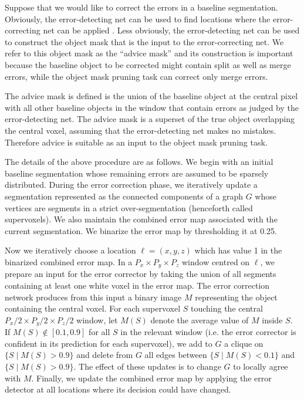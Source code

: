 \documentclass{article}
\begin{document}
Suppose that we would like to correct the errors in a baseline
segmentation.  Obviously, the error-detecting net can be used to find
locations where the error-correcting net can be applied
\cite{multipass}.  Less obviously, the error-detecting net can be used
to construct the object mask that is the input to the error-correcting
net. We refer to this object mask as the ``advice mask'' and its construction is important because the baseline object to be corrected might contain split as well as merge errors, while the object mask pruning task can correct only merge errors.

The advice mask is defined is the union of the baseline object at the
central pixel with all other baseline objects in the window that
contain errors as judged by the error-detecting net. The advice mask is
a superset of the true object overlapping the central voxel, assuming
that the error-detecting net makes no mistakes.  Therefore advice is
suitable as an input to the object mask pruning task.

The details of the above procedure are as follows. We begin with an initial baseline segmentation whose remaining errors are assumed to be sparsely distributed. During the error correction phase, we iteratively update a segmentation represented as the connected components of a graph $G$ whose vertices are segments in a strict over-segmentation (henceforth called supervoxels). We also maintain the combined error map associated with the current segmentation. We binarize the error map by thresholding it at 0.25.

Now we iteratively choose a location $\ell=(x,y,z)$ which has value 1 in the binarized combined error map. In a $P_x \times P_y \times P_z$ window centred on $\ell$, we prepare an input for the error corrector by taking the union of all segments containing at least one white voxel in the error map. The error correction network produces from this input a binary image $M$ representing the object containing the central voxel. For each supervoxel $S$ touching the central $P_x/2 \times P_y/2 \times P_z/2$ window, let $M(S)$ denote the average value of $M$ inside $S$. If $M(S) \not \in [0.1,0.9]$ for all $S$ in the relevant window (i.e. the error corrector is confident in its prediction for each supervoxel), we add to $G$ a clique on $\{S \mid M(S) > 0.9\}$ and delete from $G$ all edges between $\{S \mid M(S) < 0.1\}$ and $\{S \mid M(S) > 0.9\}$. The effect of these updates is to change $G$ to locally agree with $M$. Finally, we update the combined error map by applying the error detector at all locations where its decision could have changed.
\end{document}
